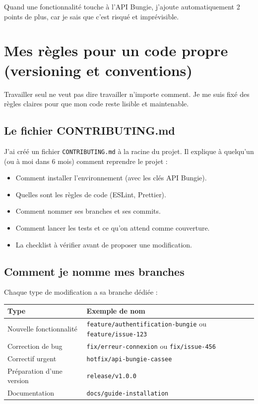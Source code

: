 Quand une fonctionnalité touche à l'API Bungie, j'ajoute automatiquement 2 points de plus, car je sais que c'est risqué et imprévisible.

\section{Mes règles pour un code propre (versioning et conventions)}

Travailler seul ne veut pas dire travailler n'importe comment. Je me suis fixé des règles claires pour que mon code reste lisible et maintenable.

\subsection{Le fichier CONTRIBUTING.md}

J'ai créé un fichier \texttt{CONTRIBUTING.md} à la racine du projet. Il explique à quelqu'un (ou à moi dans 6 mois) comment reprendre le projet :

\begin{itemize}
    \item Comment installer l'environnement (avec les clés API Bungie).
    \item Quelles sont les règles de code (ESLint, Prettier).
    \item Comment nommer ses branches et ses commits.
    \item Comment lancer les tests et ce qu'on attend comme couverture.
    \item La checklist à vérifier avant de proposer une modification.
\end{itemize}

\subsection{Comment je nomme mes branches}

Chaque type de modification a sa branche dédiée :

\begin{center}
\begin{tabular}{|p{3cm}|p{8cm}|}
\hline
\textbf{Type} & \textbf{Exemple de nom} \\
\hline
Nouvelle fonctionnalité & \texttt{feature/authentification-bungie} ou \texttt{feature/issue-123} \\
\hline
Correction de bug & \texttt{fix/erreur-connexion} ou \texttt{fix/issue-456} \\
\hline
Correctif urgent & \texttt{hotfix/api-bungie-cassee} \\
\hline
Préparation d'une version & \texttt{release/v1.0.0} \\
\hline
Documentation & \texttt{docs/guide-installation} \\
\hline
\end{tabular}
\end{center}

